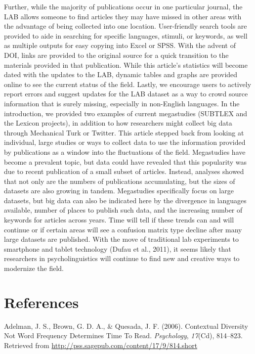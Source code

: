 \documentclass[english,man]{apa6}
\theoremstyle{definition}
\theoremstyle{definition}
\theoremstyle{definition}
\theoremstyle{remark}
\begin{document}
Further, while the majority of publications occur in one particular
journal, the LAB allows someone to find articles they may have missed in
other areas with the advantage of being collected into one location.
User-friendly search tools are provided to aide in searching for
specific languages, stimuli, or keywords, as well as multiple outputs
for easy copying into Excel or SPSS. With the advent of DOI, links are
provided to the original source for a quick transition to the materials
provided in that publication. While this article's statistics will
become dated with the updates to the LAB, dynamic tables and graphs are
provided online to see the current status of the field. Lastly, we
encourage users to actively report errors and suggest updates for the
LAB dataset as a way to crowd source information that is surely missing,
especially in non-English languages. In the introduction, we provided
two examples of current megastudies (SUBTLEX and the Lexicon projects),
in addition to how researchers might collect big data through Mechanical
Turk or Twitter. This article stepped back from looking at individual,
large studies or ways to collect data to use the information provided by
publications as a window into the fluctuations of the field. Megastudies
have become a prevalent topic, but data could have revealed that this
popularity was due to recent publication of a small subset of articles.
Instead, analyses showed that not only are the numbers of publications
accumulating, but the sizes of datasets are also growing in tandem.
Megastudies specifically focus on large datasets, but big data can also
be indicated here by the divergence in languages available, number of
places to publish such data, and the increasing number of keywords for
articles across years. Time will tell if these trends can and will
continue or if certain areas will see a confusion matrix type decline
after many large datasets are published. With the move of traditional
lab experiments to smartphone and tablet technology (Dufau et al.,
2011), it seems likely that researchers in psycholinguistics will
continue to find new and creative ways to modernize the field.

\newpage

\section{References}\label{references}

\setlength{\parindent}{-0.5in} \setlength{\leftskip}{0.5in}

\hypertarget{refs}{}
\hypertarget{ref-Adelman2006}{}
Adelman, J. S., Brown, G. D. A., \& Quesada, J. F. (2006). Contextual
Diversity Not Word Frequency Determines Time To Read. \emph{Psychology},
\emph{17}(Cd), 814--823. Retrieved from
\url{http://pss.sagepub.com/content/17/9/814.short}
\end{document}
